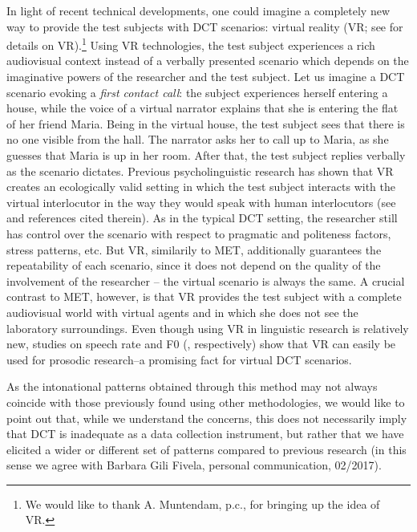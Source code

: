 \documentclass[output=paper]{LSP/langsci}
\begin{document}
In light of recent technical developments, one could imagine a completely new way to provide the test subjects with DCT scenarios: virtual reality (VR; see \citealt{Fox.2009} for details on VR).\footnote{We would like to thank A. Muntendam, p.c., for bringing up the idea of VR.} Using VR technologies, the test subject experiences a rich audiovisual context instead of a verbally presented scenario which depends on the imaginative powers of the researcher and the test subject. Let us imagine a DCT scenario evoking a \textit{first contact call}: the subject experiences herself entering a house, while the voice of a virtual narrator explains that she is entering the flat of her friend Maria. Being in the virtual house, the test subject sees that there is no one visible from the hall. The narrator asks her to call up to Maria, as she guesses that Maria is up in her room. After that, the test subject replies verbally as the scenario dictates. 
Previous psycholinguistic research has shown that VR creates an ecologically valid setting in which the test subject interacts with the virtual interlocutor in the way they would speak with human interlocutors (see \citealt{Heyselaar.2017,PEETERS.2017} and references cited therein). As in the typical DCT setting, the researcher still has control over the scenario with respect to pragmatic and politeness factors, stress patterns, etc. But VR, similarily to MET, additionally guarantees the repeatability of each scenario, since it does not depend on the quality of the involvement of the researcher – the virtual scenario is always the same. A crucial contrast to MET, however, is that VR provides the test subject with a complete audiovisual world with virtual agents and in which she does not see the laboratory surroundings. Even though using VR in linguistic research is relatively new, studies on speech rate and F0 (\citealt{Gijssels.2015,StaumCasasanto.2010}, respectively) show that VR can easily be used for prosodic research--a promising fact for virtual DCT scenarios.

As the intonational patterns obtained through this method may not always coincide with those previously found using other methodologies, we would like to point out that, while we understand the concerns, this does not necessarily imply that DCT is inadequate as a data collection instrument, but rather that we have elicited a wider or different set of patterns compared to previous research (in this sense we agree with Barbara Gili Fivela, personal communication, 02/2017).
\end{document}
